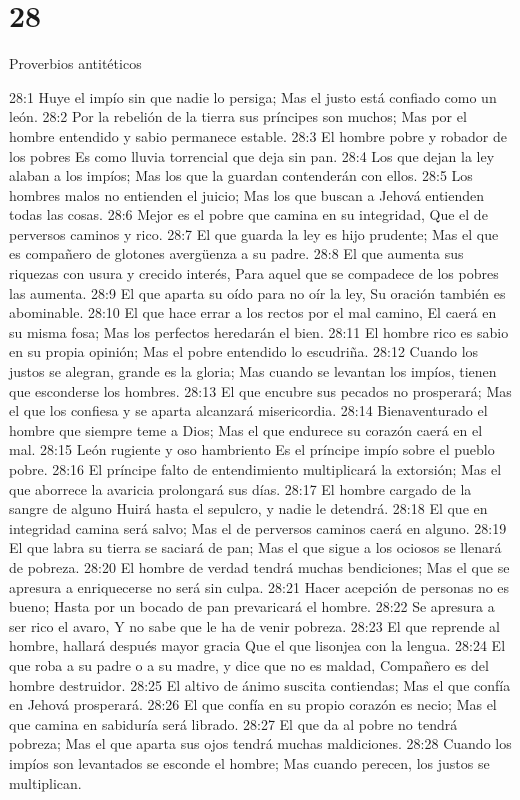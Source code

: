 \chapter{28}

Proverbios antitéticos  

28:1 Huye el impío sin que nadie lo persiga;  
Mas el justo está confiado como un león.  
28:2 Por la rebelión de la tierra sus príncipes son muchos;  
Mas por el hombre entendido y sabio permanece estable.  
28:3 El hombre pobre y robador de los pobres  
Es como lluvia torrencial que deja sin pan.  
28:4 Los que dejan la ley alaban a los impíos; 
Mas los que la guardan contenderán con ellos.  
28:5 Los hombres malos no entienden el juicio;  
Mas los que buscan a Jehová entienden todas las cosas.  
28:6 Mejor es el pobre que camina en su integridad,  
Que el de perversos caminos y rico.  
28:7 El que guarda la ley es hijo prudente;  
Mas el que es compañero de glotones avergüenza a su padre.  
28:8 El que aumenta sus riquezas con usura y crecido interés,  
Para aquel que se compadece de los pobres las aumenta.  
28:9 El que aparta su oído para no oír la ley,  
Su oración también es abominable.  
28:10 El que hace errar a los rectos por el mal camino,  
El caerá en su misma fosa;  
Mas los perfectos heredarán el bien.  
28:11 El hombre rico es sabio en su propia opinión;  
Mas el pobre entendido lo escudriña.  
28:12 Cuando los justos se alegran, grande es la gloria;  
Mas cuando se levantan los impíos, tienen que esconderse los hombres.  
28:13 El que encubre sus pecados no prosperará;  
Mas el que los confiesa y se aparta alcanzará misericordia.  
28:14 Bienaventurado el hombre que siempre teme a Dios;  
Mas el que endurece su corazón caerá en el mal.  
28:15 León rugiente y oso hambriento  
Es el príncipe impío sobre el pueblo pobre.  
28:16 El príncipe falto de entendimiento multiplicará la extorsión;  
Mas el que aborrece la avaricia prolongará sus días.  
28:17 El hombre cargado de la sangre de alguno  
Huirá hasta el sepulcro, y nadie le detendrá.  
28:18 El que en integridad camina será salvo;  
Mas el de perversos caminos caerá en alguno.  
28:19 El que labra su tierra se saciará de pan;  
Mas el que sigue a los ociosos se llenará de pobreza.  
28:20 El hombre de verdad tendrá muchas bendiciones;  
Mas el que se apresura a enriquecerse no será sin culpa.  
28:21 Hacer acepción de personas no es bueno;  
Hasta por un bocado de pan prevaricará el hombre.  
28:22 Se apresura a ser rico el avaro,  
Y no sabe que le ha de venir pobreza.  
28:23 El que reprende al hombre, hallará después mayor gracia  
Que el que lisonjea con la lengua.  
28:24 El que roba a su padre o a su madre, y dice que no es maldad,  
Compañero es del hombre destruidor.  
28:25 El altivo de ánimo suscita contiendas;  
Mas el que confía en Jehová prosperará.  
28:26 El que confía en su propio corazón es necio;  
Mas el que camina en sabiduría será librado.  
28:27 El que da al pobre no tendrá pobreza;  
Mas el que aparta sus ojos tendrá muchas maldiciones.  
28:28 Cuando los impíos son levantados se esconde el hombre;  
Mas cuando perecen, los justos se multiplican. 


